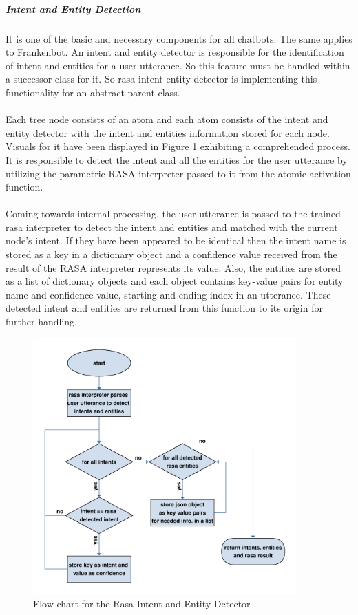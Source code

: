 \subparagraph*{Intent and Entity Detection}
It is one of the basic and necessary components for all chatbots. The same applies to Frankenbot. An intent and entity detector is responsible for the identification of intent and entities for a user utterance. So this feature must be handled within a successor class for it. So rasa intent entity detector is implementing this functionality for an abstract parent class.
\\~\\
Each tree node consists of an atom and each atom consists of the intent and entity detector with the intent and entities information stored for each node. Visuals for it have been displayed in Figure \ref{fig:flowIntandEnt} exhibiting a comprehended process. It is responsible to detect the intent and all the entities for the user utterance by utilizing the parametric RASA interpreter passed to it from the atomic activation function.
\\~\\
Coming towards internal processing, the user utterance is passed to the trained rasa interpreter to detect the intent and entities and matched with the current node's intent. If they have been appeared to be identical then the intent name is stored as a key in a dictionary object and a confidence value received from the result of the RASA interpreter represents its value. Also, the entities are stored as a list of dictionary objects and each object contains key-value pairs for entity name and confidence value, starting and ending index in an utterance. These detected intent and entities are returned from this function to its origin for further handling.

\begin{figure}[!h]
    \centering
    \includegraphics[width=0.9\textwidth]{img/Intent_entity_detector.pdf}
    \caption{Flow chart for the Rasa Intent and Entity Detector}
    \label{fig:flowIntandEnt}
\end{figure}

